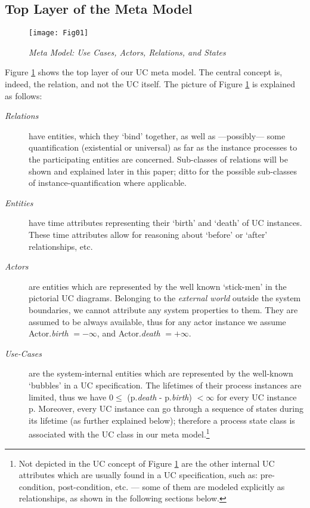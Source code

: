 \subsection{Top Layer of the Meta Model}
\begin{figure}[t!]
\begin{center}
\texttt{[image: Fig01]}\\   
\caption{\it Meta Model: Use Cases, Actors, Relations, and States}
\label{fig:1} 
\end{center} 
\end{figure}
Figure \ref{fig:1} shows the top layer of our UC meta model. 
The central concept is, indeed, the relation, and not the UC 
itself. The picture of Figure \ref{fig:1} is explained as 
follows:
\begin{description}
\item[\it Relations] have entities, which they `bind' together, 
as well as ---possibly--- some quantification (existential 
or universal) as far as the instance processes to the participating 
entities are concerned. Sub-classes of relations will be shown and 
explained later in this paper; ditto for the possible sub-classes 
of instance-quantification where applicable.
\item[\it Entities] have time attributes representing their `birth'
and `death' of UC instances. These time attributes allow for 
reasoning about `before' or `after' relationships, etc.
\item[\it Actors] are entities which are represented by the well known 
`stick-men' in the pictorial UC diagrams. Belonging to the \emph{external
world} outside the system boundaries, we cannot attribute any system 
properties to them. They are assumed to be always available, thus 
for any actor instance we assume Actor.\emph{birth} $= -\infty$, 
and Actor.\emph{death} $= +\infty$.
\item[\it Use-Cases] are the system-internal entities which are 
represented by the well-known `bubbles' in a UC specification. The 
lifetimes of their process instances are limited, thus we have $0 
\leq$ (p.\emph{death} - p.\emph{birth}) $< \infty$ for every UC 
instance p. Moreover, every UC instance can go through a sequence 
of states during its lifetime (as further explained below); therefore 
a process state class is associated with the UC class in our meta 
model.\footnote{Not depicted in the UC concept of Figure \ref{fig:1} 
	are the other internal UC attributes which are usually found in 
	a UC specification, such as: pre-condition, post-condition, etc. 
	\cite{KGu04} --- some of them are modeled explicitly as relationships, 
	as shown in the following sections below.}
\end{description}

